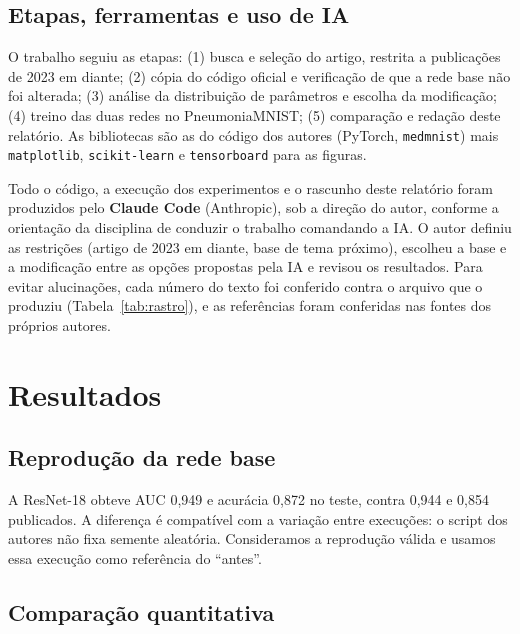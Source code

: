 \documentclass[runningheads]{llncs}
\begin{document}
\subsection{Etapas, ferramentas e uso de IA}

O trabalho seguiu as etapas: (1) busca e seleção do artigo, restrita a
publicações de 2023 em diante; (2) cópia do código oficial e verificação
de que a rede base não foi alterada; (3) análise da distribuição de
parâmetros e escolha da modificação; (4) treino das duas redes no
PneumoniaMNIST; (5) comparação e redação deste relatório. As bibliotecas
são as do código dos autores (PyTorch, \texttt{medmnist}) mais
\texttt{matplotlib}, \texttt{scikit-learn} e \texttt{tensorboard} para as
figuras.

Todo o código, a execução dos experimentos e o rascunho deste relatório
foram produzidos pelo \textbf{Claude Code} (Anthropic), sob a direção do
autor, conforme a orientação da disciplina de conduzir o trabalho
comandando a IA. O autor definiu as restrições (artigo de 2023 em diante,
base de tema próximo), escolheu a base e a modificação entre as opções
propostas pela IA e revisou os resultados. Para evitar alucinações, cada
número do texto foi conferido contra o arquivo que o produziu
(Tabela~\ref{tab:rastro}), e as referências foram conferidas nas fontes
dos próprios autores.

\section{Resultados}

\subsection{Reprodução da rede base}

A ResNet-18 obteve AUC 0,949 e acurácia 0,872 no teste, contra 0,944 e
0,854 publicados. A diferença é compatível com a variação entre execuções:
o script dos autores não fixa semente aleatória. Consideramos a reprodução
válida e usamos essa execução como referência do ``antes''.

\subsection{Comparação quantitativa}
\end{document}
